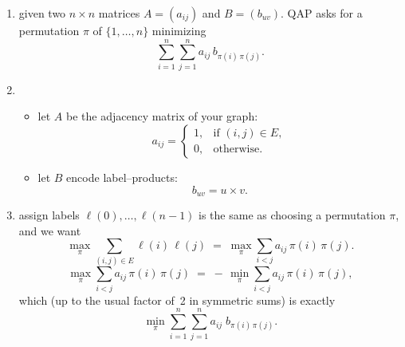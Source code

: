 \documentclass[12pt]{article}
\begin{document}

\begin{enumerate}

  
  \item given two $n\times n$ matrices $A=(a_{ij})$ and $B=(b_{uv})$. QAP asks for a permutation $\pi$ of $\{1,\dots,n\}$ minimizing
    \[
      \sum_{i=1}^n\sum_{j=1}^n a_{ij}\,b_{\pi(i)\,\pi(j)}.
    \]

  \item
    \begin{itemize}
      \item let $A$ be the adjacency matrix of your graph:
        \[
          a_{ij} = 
          \begin{cases}
            1, & \text{if }(i,j)\in E,\\
            0, & \text{otherwise.}
          \end{cases}
        \]
      \item let $B$ encode label–products:
        \[
          b_{uv} = u \times v.
        \]
    \end{itemize}

  \item 
    assign labels $\ell(0),\dots,\ell(n-1)$ is the same as choosing a permutation $\pi$, and we want
    \[
      \max_{\pi}\sum_{(i,j)\in E} \ell(i)\,\ell(j)
      \;=\;
      \max_{\pi}\sum_{i<j} a_{ij}\,\pi(i)\,\pi(j).
    \]
    \[
      \max_{\pi}\sum_{i<j} a_{ij}\,\pi(i)\,\pi(j)
      \;=\;
      -\,\min_{\pi}\sum_{i<j} a_{ij}\,\pi(i)\,\pi(j),
    \]
    which (up to the usual factor of 2 in symmetric sums) is exactly
    \[
      \min_{\pi}\sum_{i=1}^n\sum_{j=1}^n a_{ij}\;b_{\pi(i)\,\pi(j)}.
    \]
\end{enumerate}
\end{document}
